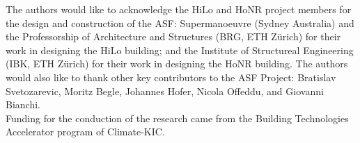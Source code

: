 The authors would like to acknowledge the HiLo and HoNR project members for the design and construction of the ASF: Supermanoeuvre (Sydney Australia) and the Professorship of Architecture and Structures (BRG, ETH Zürich) for their work in designing the HiLo building; and the Institute of Structureal Engineering (IBK, ETH Zürich) for their work in designing the HoNR building. The authors would also like to thank other key contributors to the ASF Project: Bratislav Svetozarevic, Moritz Begle, Johannes Hofer, Nicola Offeddu, and Giovanni Bianchi. \\

Funding for the conduction of the research came from the Building Technologies Accelerator program of Climate-KIC.